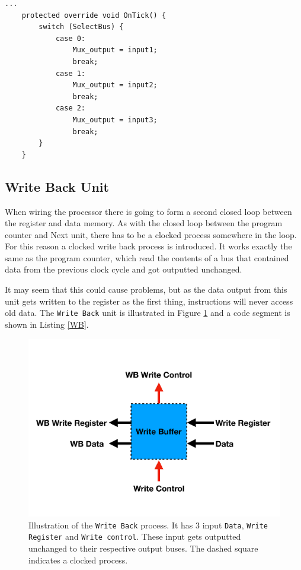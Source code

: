         \begin{minipage}{\linewidth}
            \begin{lstlisting}[language={[Sharp]C}, caption={An example of a \texttt{Multiplexer} process SME code. The whole multiplexer simply consists of a \texttt{switch} statement that selects an input to output dependent on \texttt{SelectBus}.},captionpos=b, label = MUX]
...
    protected override void OnTick() {
        switch (SelectBus) {
            case 0:
                Mux_output = input1;
                break;
            case 1:
                Mux_output = input2; 
                break;
            case 2:
                Mux_output = input3; 
                break;
        }
    }
            \end{lstlisting}
        \end{minipage}
\newpage
    \subsection{Write Back Unit}
        When wiring the processor there is going to form a second closed loop between the register and data memory. As with the closed loop between the program counter and Next unit, there has to be a clocked process somewhere in the loop. For this reason a clocked write back process is introduced. It works exactly the same as the program counter, which read the contents of a bus that contained data from the previous clock cycle and got outputted unchanged. 
        
        It may seem that this could cause problems, but as the data output from this unit gets written to the register as the first thing, instructions will never access old data.  The \texttt{Write Back} unit is illustrated in Figure \ref{fig:WB} and a code segment is shown in Listing \ref{WB}.
        \begin{figure}[h!]
            \centering
            \includegraphics[scale=0.35]{pictures/WB.pdf}
            \caption{Illustration of the \texttt{Write Back} process. It has 3 input \texttt{Data}, \texttt{Write Register} and \texttt{Write control}. These input gets outputted unchanged to their respective output buses. The dashed square indicates a clocked process.}
            \label{fig:WB}
        \end{figure}
    

